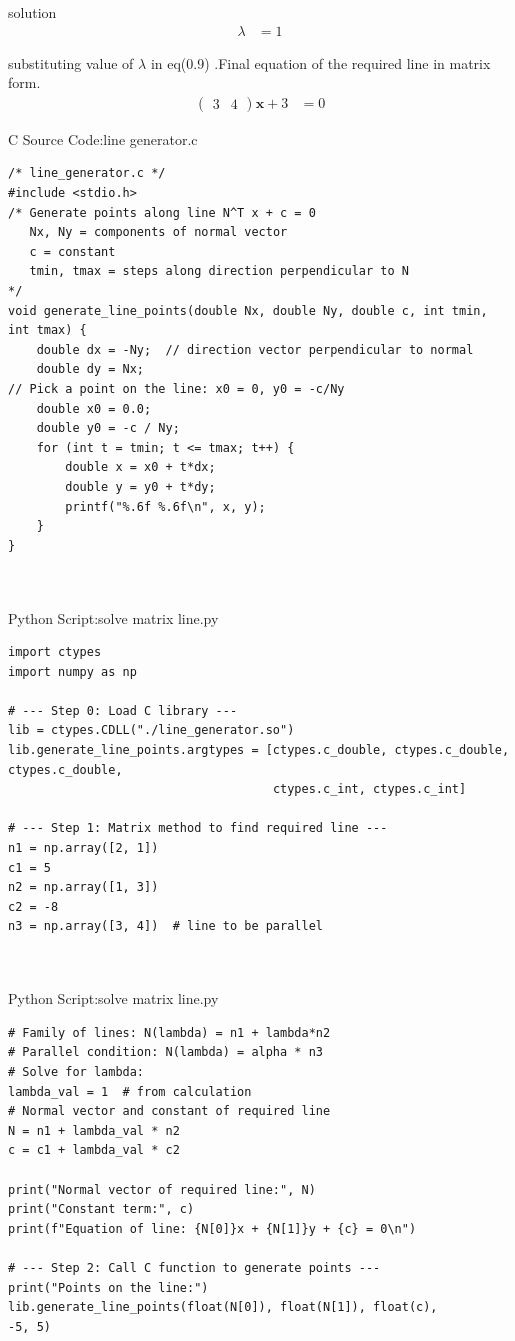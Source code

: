 \documentclass{beamer}
\numberwithin{equation}{section}
\theoremstyle{remark}
\newcommand{\myvec}[1]{\ensuremath{\begin{pmatrix}#1\end{pmatrix}}}
\let\vec\mathbf
\begin{document}
\begin{frame}{solution}
\begin{align}
\lambda &= 1
\end{align}

substituting value of $\lambda$ in eq(0.9) .Final equation of the required line in matrix form.
\begin{align}
\myvec{3 & 4}\vec{x} + 3 &= 0
\end{align}
\end{frame}
\begin{frame}[fragile]{C Source Code:line generator.c}
\begin{verbatim}
/* line_generator.c */
#include <stdio.h>
/* Generate points along line N^T x + c = 0
   Nx, Ny = components of normal vector
   c = constant
   tmin, tmax = steps along direction perpendicular to N
*/
void generate_line_points(double Nx, double Ny, double c, int tmin, int tmax) {
    double dx = -Ny;  // direction vector perpendicular to normal
    double dy = Nx;
// Pick a point on the line: x0 = 0, y0 = -c/Ny
    double x0 = 0.0;
    double y0 = -c / Ny;
    for (int t = tmin; t <= tmax; t++) {
        double x = x0 + t*dx;
        double y = y0 + t*dy;
        printf("%.6f %.6f\n", x, y);
    }
}



\end{verbatim}
\end{frame}

\begin{frame}[fragile]{Python Script:solve matrix line.py}
\begin{verbatim}
import ctypes
import numpy as np

# --- Step 0: Load C library ---
lib = ctypes.CDLL("./line_generator.so")
lib.generate_line_points.argtypes = [ctypes.c_double, ctypes.c_double, ctypes.c_double,
                                     ctypes.c_int, ctypes.c_int]

# --- Step 1: Matrix method to find required line ---
n1 = np.array([2, 1])
c1 = 5
n2 = np.array([1, 3])
c2 = -8
n3 = np.array([3, 4])  # line to be parallel



\end{verbatim}
\end{frame}
\begin{frame}[fragile]{Python Script:solve matrix line.py}
\begin{verbatim}
# Family of lines: N(lambda) = n1 + lambda*n2
# Parallel condition: N(lambda) = alpha * n3
# Solve for lambda:
lambda_val = 1  # from calculation
# Normal vector and constant of required line
N = n1 + lambda_val * n2
c = c1 + lambda_val * c2

print("Normal vector of required line:", N)
print("Constant term:", c)
print(f"Equation of line: {N[0]}x + {N[1]}y + {c} = 0\n")

# --- Step 2: Call C function to generate points ---
print("Points on the line:")
lib.generate_line_points(float(N[0]), float(N[1]), float(c), 
-5, 5)
\end{verbatim}
\end{frame}
\end{document}
